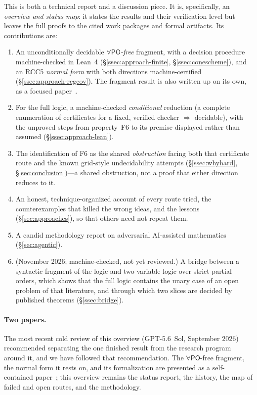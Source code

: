 \documentclass[11pt]{article}
\newcommand{\PO}{\mathsf{PO}}
\theoremstyle{plain}
\theoremstyle{definition}
\begin{document}
This is both a technical report and a discussion piece. It is,
specifically, an \emph{overview and status map}: it states the results
and their verification level but leaves the full proofs to the cited work
packages and formal artifacts. Its contributions are:
\begin{enumerate}
  \item An unconditionally decidable \emph{$\forall\PO$-free} fragment,
    with a decision procedure machine-checked in Lean~4
    (\S\ref{ssec:approach-finite}, \S\ref{ssec:conescheme}), and an RCC5
    \emph{normal form} with both directions machine-certified
    (\S\ref{ssec:approach-regcov}). The fragment result is also written up
    on its own, as a focused paper~\cite{PofreeFragmentPaper}.
  \item For the full logic, a machine-checked \emph{conditional} reduction
    (a complete enumeration of certificates for a fixed, verified checker
    $\Rightarrow$ decidable), with the unproved steps from property~F6 to
    its premise displayed rather than assumed (\S\ref{ssec:approach-lean}).
  \item The identification of F6 as the shared \emph{obstruction} facing
    both that certificate route and the known grid-style undecidability
    attempts (\S\ref{ssec:whyhard}, \S\ref{sec:conclusion})---a shared
    obstruction, not a proof that either direction reduces to it.
  \item An honest, technique-organized account of every route tried, the
    counterexamples that killed the wrong ideas, and the lessons
    (\S\ref{sec:approaches}), so that others need not repeat them.
  \item A candid methodology report on adversarial AI-assisted
    mathematics (\S\ref{sec:agentic}).
  \item (November 2026; machine-checked, not yet reviewed.) A bridge between
    a syntactic fragment of the logic and two-variable logic over strict
    partial orders, which shows that the full logic contains the unary case
    of an open problem of that literature, and through which two slices are
    decided by published theorems (\S\ref{ssec:bridge}).
\end{enumerate}

\paragraph{Two papers.} The most recent cold review of this overview
(GPT-5.6~Sol, September 2026)~\cite{GPT56SolReview} recommended separating
the one finished result from the research program around it, and we have
followed that recommendation. The $\forall\PO$-free fragment, the normal
form it rests on, and its formalization are presented as a self-contained
paper~\cite{PofreeFragmentPaper}; this overview remains the status report,
the history, the map of failed and open routes, and the methodology.
\end{document}
